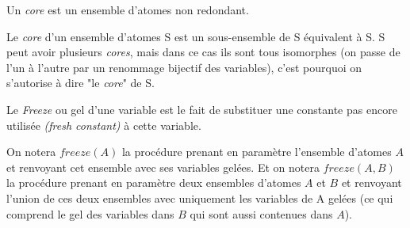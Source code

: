 \begin{definition}\label{def:Core}
Un \textit{core} est un ensemble d'atomes non redondant.
\par Le \textit{core} d'un ensemble d'atomes S est un sous-ensemble de S équivalent à S. S peut avoir plusieurs \textit{cores}, mais dans ce cas ils sont tous isomorphes (on passe de l'un à l'autre par un renommage bijectif des variables), c'est pourquoi on s'autorise à dire "le \textit{core}" de S.
\end{definition}
Le \textit{Freeze} ou gel d'une variable est le fait de substituer une constante pas encore utilisée \textit{(fresh constant)} à cette variable.

\begin{notation}\label{not:freeze()} On notera $freeze(A)$ la procédure prenant en paramètre l'ensemble d'atomes $A$ et renvoyant cet ensemble avec ses variables gelées. Et on notera $freeze(A,B)$ la procédure prenant en paramètre deux ensembles d'atomes $A$ et $B$ et renvoyant l'union de ces deux ensembles avec uniquement les variables de A gelées (ce qui comprend le gel des variables dans $B$ qui sont aussi contenues dans $A$).
\end{notation}









